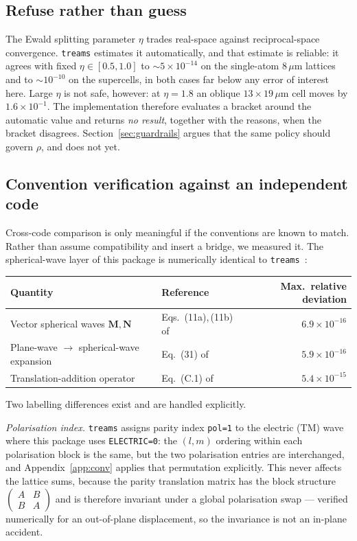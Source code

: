 \documentclass[11pt,a4paper]{article}
\newcommand{\um}{\ensuremath{\,\mu\mathrm{m}}}
\newcommand{\code}[1]{\texttt{\small #1}}
\theoremstyle{plain}
\theoremstyle{definition}
\begin{document}
\subsection{Refuse rather than guess}

The Ewald splitting parameter $\eta$ trades real-space against reciprocal-space
convergence. \texttt{treams} estimates it automatically, and that estimate is
reliable: it agrees with fixed $\eta \in [0.5, 1.0]$ to $\sim\!5\times10^{-14}$
on the single-atom $8\um$ lattices and to $\sim\!10^{-10}$ on the supercells,
in both cases far below any error of interest here. Large $\eta$ is not safe,
however: at $\eta = 1.8$ an oblique
$13\times19\um$ cell moves by $1.6\times10^{-1}$. The implementation therefore
evaluates a bracket around the automatic value and returns \emph{no result},
together with the reasons, when the bracket disagrees. Section~\ref{sec:guardrails}
argues that the same policy should govern $\rho$, and does not yet.

\subsection{Convention verification against an independent code}
\label{sec:conv}

Cross-code comparison is only meaningful if the conventions are known to match.
Rather than assume compatibility and insert a bridge, we measured it. The
spherical-wave layer of this package is numerically identical to
\texttt{treams}~\cite{beutel2024}:

\begin{center}\small
\begin{tabular}{@{}llr@{}}
\toprule
Quantity & Reference & Max.\ relative deviation \\
\midrule
Vector spherical waves $\mathbf{M}, \mathbf{N}$ & Eqs.~(11a),\,(11b) of \cite{beutel2024}
  & $6.9\times10^{-16}$ \\
Plane-wave $\to$ spherical-wave expansion & Eq.~(31) of \cite{beutel2024}
  & $5.9\times10^{-16}$ \\
Translation-addition operator & Eq.~(C.1) of \cite{beutel2024}
  & $5.4\times10^{-15}$ \\
\bottomrule
\end{tabular}
\end{center}

\noindent
Two labelling differences exist and are handled explicitly.

\emph{Polarisation index.} \texttt{treams} assigns parity index \code{pol=1} to
the electric (TM) wave where this package uses \code{ELECTRIC=0}: the $(l,m)$
ordering within each polarisation block is the same, but the two polarisation
entries are interchanged, and Appendix~\ref{app:conv} applies that permutation
explicitly. This never affects the lattice sums, because the parity translation
matrix has the block structure
$\left(\begin{smallmatrix} A & B \\ B & A\end{smallmatrix}\right)$ and is
therefore invariant under a global polarisation swap --- verified numerically for
an out-of-plane displacement, so the invariance is not an in-plane accident.
\end{document}
